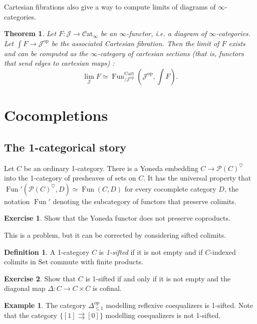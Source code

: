 \documentclass[11pt]{article}
\newtheorem{theorem}{Theorem}
\theoremstyle{definition}
\newtheorem{definition}{Definition}
\newtheorem{example}{Example}
\newtheorem{exercise}{Exercise}
\newcommand{\Catinf}{\mathcal{C}\mathrm{at}_{\infty}}
\newcommand{\Fun}{\operatorname{Fun}}
\newcommand{\heart}{\heartsuit}
\newcommand{\J}{\mathcal{J}}
\newcommand{\op}{\mathrm{op}}
\renewcommand{\P}{\mathcal{P}}
\newcommand{\Set}{\mathrm{Set}}
\begin{document}
Cartesian fibrations also give a way to compute limits of diagrams of $\infty$-categories.
\begin{theorem}
    Let $F : \J \to \Catinf$ be an $\infty$-functor, i.e. a diagram of $\infty$-categories.
    Let $\int F \to \J^{\op}$ be the associated Cartesian fibration.
    Then the limit of $F$ exists and can be computed as the $\infty$-category of cartesian sections (that is, functors that send edges to cartesian maps) :
    \[
        \lim_{\J} F \simeq \Fun_{/\J^{\op}}^{\mathrm{Cart}}(\J^{\op}, \int F).
    \]
\end{theorem}

\section{Cocompletions}

\subsection{The 1-categorical story}

Let $C$ be an ordinary 1-category.
There is a Yoneda embedding $C \to \P(C)^{\heart}$ into the 1-category of presheaves of sets on $C$.
It has the universal property that $\Fun'(\P(C)^{\heart}, D) \simeq \Fun(C, D)$ for every cocomplete category $D$, the notation $\Fun'$ denoting the subcategory of functors that preserve colimits.

\begin{exercise}
    Show that the Yoneda functor does not preserve coproducts.
\end{exercise}

This is a problem, but it can be corrected by considering sifted colimits.
\begin{definition}
    A 1-category $C$ is \emph{1-sifted} if it is not empty and if $C$-indexed colimits in $\Set$ commute with finite products.
\end{definition}

\begin{exercise}
    Show that $C$ is 1-sifted if and only if it is not empty and the diagonal map $\Delta : C \to C \times C$ is cofinal.
\end{exercise}

\begin{example}
    The category $\Delta^{\op}_{\leqslant 1}$ modelling reflexive coequalizers is 1-sifted.
    Note that the category $\{[1] \rightrightarrows [0]\}$ modelling coequalizers is not 1-sifted.
\end{example}
\end{document}

